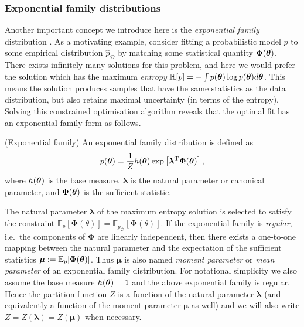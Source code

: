 \subsubsection{Exponential family distributions}
Another important concept we introduce here is the \emph{exponential family} distribution \citep{koopman:expfam1936}.
%
As a motivating example, consider fitting a probabilistic model $p$ to some empirical distribution $\hat{p}_{\mathcal{D}}$ by matching some statistical quantity $\bm{\Phi}(\bm{\theta})$. There exists infinitely many solutions for this problem, and here we would prefer the solution which has the maximum \emph{entropy} $\mathbb{H}[p] = - \int p(\bm{\theta}) \log p(\bm{\theta}) d\bm{\theta}$. This means the solution produces samples that have the same statistics as the data distribution, but also retains maximal uncertainty (in terms of the entropy). Solving this constrained optimisation algorithm reveals that the optimal fit has an exponential family form as follows.
%
\begin{definition}
(Exponential family)
An exponential family distribution is defined as 
\begin{equation}
p(\bm{\theta}) = \frac{1}{Z} h(\bm{\theta}) \exp \left[ \bm{\lambda}^{\text{T}} \bm{\Phi} ( \bm{\theta} )  \right],
\label{eq:chap2_vi_expfam}
\end{equation}
where $h(\bm{\theta})$ is the base measure, $\bm{\lambda}$ is the natural parameter or canonical parameter, and $\bm{\Phi}(\bm{\theta})$ is the sufficient statistic.
\end{definition}
%
The natural parameter $\bm{\lambda}$ of the maximum entropy solution is selected to satisfy the constraint $\mathbb{E}_p [\bm{\Phi}(\theta)] = \mathbb{E}_{\hat{p}_{\mathcal{D}} } [\bm{\Phi}(\theta)]$. If the exponential family is \emph{regular}, i.e.~the components of $\bm{\Phi}$ are linearly independent, then there exists a one-to-one mapping between the natural parameter and the expectation of the sufficient statistics $\bm{\mu} := \mathbb{E}_{p}[\bm{\Phi}(\bm{\theta})]$. Thus $\bm{\mu}$ is also named \emph{moment parameter} or \emph{mean parameter} of an exponential family distribution. For notational simplicity we also assume the base measure $h(\bm{\theta}) = 1$ and the above exponential family is regular. Hence the partition function $Z$ is a function of the natural parameter $\bm{\lambda}$ (and equivalently a function of the moment parameter $\bm{\mu}$ as well) and we will also write $Z = Z(\bm{\lambda}) = Z(\bm{\mu})$ when necessary. 

